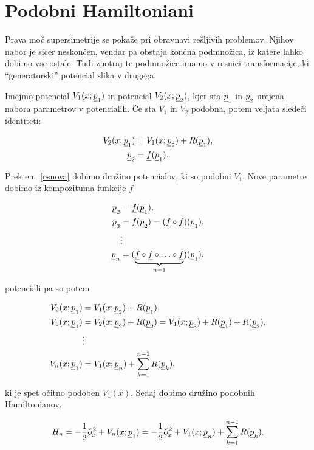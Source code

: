 \section{Podobni Hamiltoniani}

Prava mo\v c supersimetrije se poka\v ze pri obravnavi re\v sljivih problemov. Njihov nabor je sicer neskon\v cen,
vendar pa obstaja kon\v cna podmno\v zica, iz katere lahko dobimo vse ostale. Tudi znotraj te podmno\v zice imamo
v resnici transformacije, ki "`generatorski"' potencial slika v drugega.

Imejmo potencial $V_1 (x; \underline{p}_1)$ in potencial
$V_2 (x; \underline{p}_2)$, kjer sta $\underline{p}_1$ in $\underline{p}_2$ urejena nabora parametrov v potencialih. \v Ce sta
$V_1$ in $V_2$ podobna, potem veljata slede\v ci identiteti:

\begin{align}
	V_2 (x; \underline{p}_1) &= V_1 (x; \underline{p}_2) + R (\underline{p}_1), \\
	\underline{p}_2 &= \underline{f} (\underline{p}_1). \label{osnova}
\end{align}

\ni Prek en.~\eqref{osnova} dobimo dru\v zino potencialov, ki so podobni $V_1$. Nove parametre dobimo iz
kompozituma funkcije $f$

\begin{align}
	\underline{p}_2 &= \underline{f} (\underline{p}_1), \notag \\
	\underline{p}_3 &= \underline{f} (\underline{p}_2) = (\underline{f} \circ \underline{f}) (\underline{p}_1), \notag \\
	&\vdots \notag \\
	\underline{p}_n &= (\underbrace{\underline{f} \circ \underline{f} \circ \ldots \circ \underline{f}}_{n-1}) (\underline{p}_1),
\end{align}

\ni potenciali pa so potem

\begin{align}
	V_2 (x; \underline{p}_1) &= V_1 (x; \underline{p}_2) + R (\underline{p}_1), \notag \\
	V_3 (x; \underline{p}_1) &= V_2 (x; \underline{p}_2) + R (\underline{p}_2) = V_1 (x; \underline{p}_3) + R (\underline{p}_1) + R (\underline{p}_2), \notag \\
	&\vdots \notag \\
	V_n (x; \underline{p}_1) &= V_1 (x; \underline{p}_n) + \sum_{k = 1}^{n-1} R (\underline{p}_k),
\end{align}

\ni ki je spet o\v citno podoben $V_1 (x)$. Sedaj dobimo dru\v zino podobnih Hamiltonianov,

\begin{equation}
	H_n = - \frac{1}{2}\partial_x^2 + V_n (x;\underline{p}_1) = - \frac{1}{2}\partial_x^2+V_1(x;\underline{p}_n)+\sum_{k = 1}^{n-1}R(\underline{p}_k).
\end{equation}

